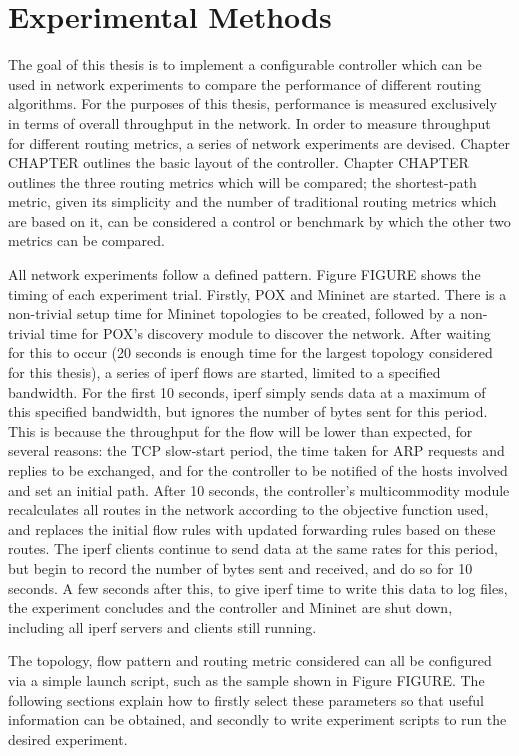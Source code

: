 \chapter{Experimental Methods}
\label{ch:methods}

The goal of this thesis is to implement a configurable controller which can be used in network experiments to compare the performance of different routing algorithms. For the purposes of this thesis, performance is measured exclusively in terms of overall throughput in the network. In order to measure throughput for different routing metrics, a series of network experiments are devised. Chapter CHAPTER outlines the basic layout of the controller. Chapter CHAPTER outlines the three routing metrics which will be compared; the shortest-path metric, given its simplicity and the number of traditional routing metrics which are based on it, can be considered a control or benchmark by which the other two metrics can be compared.

All network experiments follow a defined pattern. Figure FIGURE shows the timing of each experiment trial. Firstly, POX and Mininet are started. There is a non-trivial setup time for Mininet topologies to be created, followed by a non-trivial time for POX's discovery module to discover the network. After waiting for this to occur (20 seconds is enough time for the largest topology considered for this thesis), a series of iperf flows are started, limited to a specified bandwidth. For the first 10 seconds, iperf simply sends data at a maximum of this specified bandwidth, but ignores the number of bytes sent for this period. This is because the throughput for the flow will be lower than expected, for several reasons: the TCP slow-start period, the time taken for ARP requests and replies to be exchanged, and for the controller to be notified of the hosts involved and set an initial path. After 10 seconds, the controller's multicommodity module recalculates all routes in the network according to the objective function used, and replaces the initial flow rules with updated forwarding rules based on these routes. The iperf clients continue to send data at the same rates for this period, but begin to record the number of bytes sent and received, and do so for 10 seconds. A few seconds after this, to give iperf time to write this data to log files, the experiment concludes and the controller and Mininet are shut down, including all iperf servers and clients still running.

The topology, flow pattern and routing metric considered can all be configured via a simple launch script, such as the sample shown in Figure FIGURE. The following sections explain how to firstly select these parameters so that useful information can be obtained, and secondly to write experiment scripts to run the desired experiment. 

